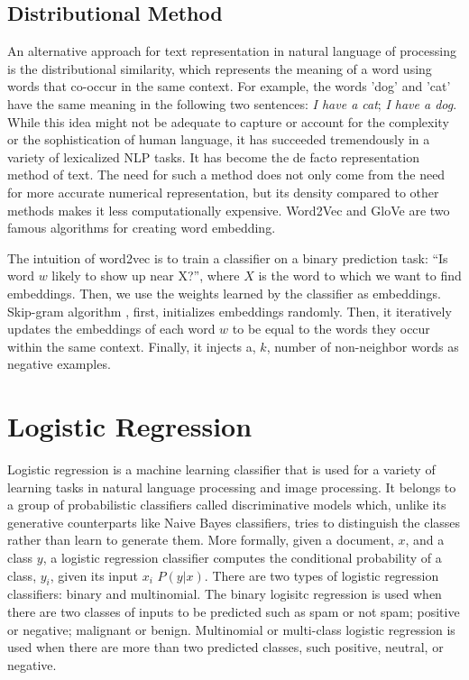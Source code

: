 \subsection{Distributional Method}
An alternative approach for text representation in natural language of processing is the distributional similarity, which represents the meaning of a word using words that co-occur in the same context. For example, the words 'dog' and 'cat' have the same meaning in the following two sentences: \emph{I have a cat}; \emph{I have a dog}. While this idea might not be adequate to capture or account for the complexity or the sophistication of human language, it has succeeded tremendously in a variety of lexicalized NLP tasks. It has become the de facto representation method of text. The need for such a method does not only come from the need for more accurate numerical representation, but its density compared to other methods makes it less computationally expensive. Word2Vec \citep{mikolov2013distributed} and GloVe \citep{pennington2014glove} are two famous algorithms for creating word embedding. 

The intuition of word2vec is to train a classifier on a binary prediction task: “Is
word $w$ likely to show up near X?”, where $X$ is the word to which we want to find embeddings. Then, we use the weights learned by the classifier as embeddings. Skip-gram algorithm \citep{mikolov2013distributed} , first, initializes embeddings randomly. Then, it iteratively updates the embeddings of each word $w$ to be equal to the words they occur within the same context. Finally, it injects a, $k$, number of non-neighbor words as negative examples. 

\section{Logistic Regression}

Logistic regression is a machine learning classifier that is used for a variety of learning tasks in natural language processing and image processing. It belongs to a group of probabilistic classifiers called discriminative models which, unlike its generative counterparts like Naive Bayes classifiers, tries to distinguish the classes rather than learn to generate them. More formally, given a document, $x$, and a class $y$, a logistic regression classifier computes the conditional probability of a class, $y_i$, given its input $x_i$ $P(y|x)$. There are two types of logistic regression classifiers: binary and multinomial. The binary logisitc regression is used when there are two classes of inputs to be predicted such as spam or not spam; positive or negative; malignant or benign. Multinomial or multi-class logistic regression is used when there are more than two predicted classes, such positive, neutral, or negative.

